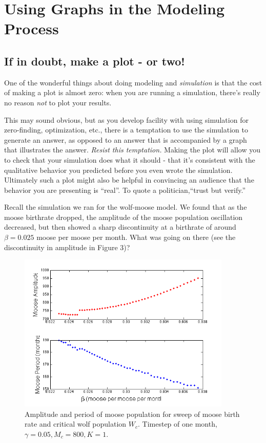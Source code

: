 \section{Using Graphs in the Modeling Process}

\subsection{If in doubt, make a plot - or two!}

One of the wonderful things about doing modeling and {\it simulation} is that the cost of making a plot is almost zero:  when you are running a simulation, there's really no reason {\it not} to plot your results. 

This may sound obvious, but as you develop facility with using simulation for zero-finding, optimization, etc., there is a temptation to use the simulation to generate an answer, as opposed to an answer that is accompanied by a graph that illustrates the answer.  {\it Resist this temptation.}  Making the plot will allow you to check that your simulation does what it should - that it's consistent with the qualitative behavior you predicted before you even wrote the simulation.  Ultimately such a plot might also be helpful in convincing an audience that the behavior you are presenting is ``real''.  To quote a politician,``trust but verify.'' 

Recall the simulation we ran for the wolf-moose model.  We found that as the moose birthrate dropped, the amplitude of the moose population oscillation decreased, but then showed a sharp discontinuity at a birthrate of around  $\beta = 0.025$ moose per moose per month.  What was going on there (see the discontinuity in amplitude in Figure 3)?  

\begin{figure}[h!]
\includegraphics[width=4in]{figs/MooseBCSweep}
\caption{Amplitude and period of moose population for sweep of moose birth rate and critical wolf population $W_c$.  Timestep of one month,  $\gamma = 0.05, M_c = 800, K=1$.}
\end{figure}

